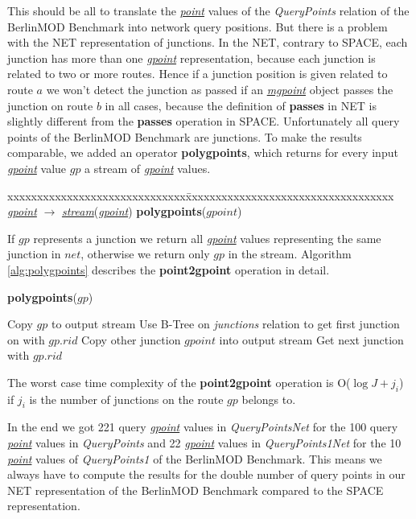 \documentclass[a4paper]{article}
\newcommand{\bmodb} {BerlinMOD Benchmark}
\newcommand{\op}[1]{\textbf{#1}}
\newcommand{\dt}[1]{\textsl{\underline{#1}}}
\begin{document}
This should be all to translate the \dt{point} values of the \textit{QueryPoints}
relation of the \bmodb{} into network query positions. But there is a problem
with the NET representation of junctions. In the NET, contrary to SPACE, each
junction has more than one \dt{gpoint} representation, because each junction is 
related to two or more routes. Hence if a junction position is given related to 
route $a$ we won't detect the junction as passed if an \dt{mgpoint} object passes 
the junction on route $b$ in all cases, because the definition of \op{passes} in 
NET is slightly different from the \op{passes} operation in 
SPACE. Unfortunately all query points of the \bmodb{} are junctions. To
make the results comparable, we added an operator \op{polygpoints}, which returns for
every input \dt{gpoint} value $gp$ a stream of \dt{gpoint} values.
\begin{tabbing}
xxxxxxxxxxxxxxxxxxxxxxxxxxxxxx\=xxxxxxxxxxxxxxxxxxxxxxxxxxxxxxxxxxx\kill
\dt{gpoint} $\rightarrow$ \dt{stream}(\dt{gpoint}) \>
\op{polygpoints}($gpoint$)\\
\end{tabbing}
If $gp$ represents a junction
we return all \dt{gpoint} values representing the same junction in $net$,
otherwise we return only $gp$ in the stream. Algorithm \ref{alg:polygpoints}
describes the \op{point2gpoint} operation in detail.
\begin{algorithm}[H]
  \caption{\op{polygpoints}($gp$)}
  \label{alg:polygpoints}
  \begin{algorithmic}[1]
    \STATE Copy $gp$ to output stream
    \STATE Use B-Tree on \textit{junctions} relation to get first junction on with $gp.rid$
        \STATE Copy other junction $gpoint$ into output stream
      \ENDIF
      \STATE Get next junction with $gp.rid$
    \ENDWHILE
  \end{algorithmic}
\end{algorithm}
The worst case time complexity of the \op{point2gpoint} operation is
O($\log J + j_i$) if $j_i$ is the number of junctions on the route $gp$ belongs to.

In the end we got 221 query \dt{gpoint} values in \textit{QueryPointsNet} for the 100
query \dt{point} values in \textit{QueryPoints} and 22 \dt{gpoint} values in
\textit{QueryPoints1Net} for the 10 \dt{point} values of \textit{QueryPoints1} of the
\bmodb{}. This means we always have to compute the results for the double number 
of query points in our NET representation of the \bmodb{} compared to the SPACE
representation.
\end{document}
